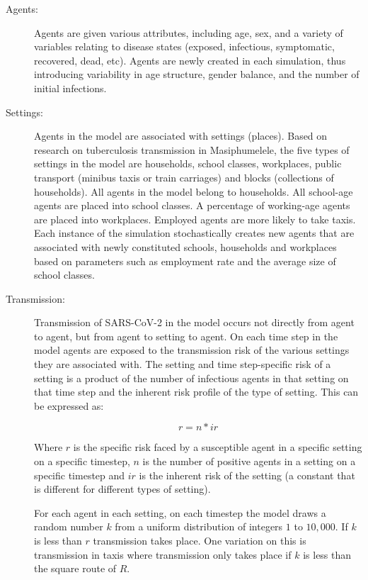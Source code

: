 \documentclass{article}
\begin{document}
\begin{description}

\item[Agents:] Agents are given various attributes, including age, sex, and a
  variety of variables relating to disease states (exposed, infectious,
  symptomatic, recovered, dead, etc). Agents are newly created in each
  simulation, thus introducing variability in age structure, gender balance, and
  the number of initial infections.

\item[Settings:] Agents in the model are associated with settings
  (places). Based on research on tuberculosis transmission in Masiphumelele, the
  five types of settings in the model are households, school classes,
  workplaces, public transport (minibus taxis or train carriages) and blocks
  (collections of households).\cite{Andrews2014} All agents in the model belong
  to households. All school-age agents are placed into school classes. A
  percentage of working-age agents are placed into workplaces. Employed agents
  are more likely to take taxis. Each instance of the simulation stochastically
  creates new agents that are associated with newly constituted schools,
  households and workplaces based on parameters such as employment rate and the
  average size of school classes.

\item[Transmission:] Transmission of SARS-CoV-2 in the model occurs not directly
  from agent to agent, but from agent to setting to agent. On each time step in
  the model agents are exposed to the transmission risk of the various settings
  they are associated with. The setting and time step-specific risk of a setting
  is a product of the number of infectious agents in that setting on that time
  step and the inherent risk profile of the type of setting. This can be
  expressed as:

  \begin{equation*}
    r = n * ir
  \end{equation*}

  Where $r$ is the specific risk faced by a susceptible agent in a specific
  setting on a specific timestep, $n$ is the number of positive agents in a
  setting on a specific timestep and $ir$ is the inherent risk of the setting (a
  constant that is different for different types of setting).

  For each agent in each setting, on each timestep the model draws a random
  number $k$ from a uniform distribution of integers $1$ to $10,000$. If $k$ is less
  than $r$ transmission takes place. One variation on this is transmission in
  taxis where transmission only takes place if $k$ is less than the square route
  of $R$.


\end{description}
\end{document}
